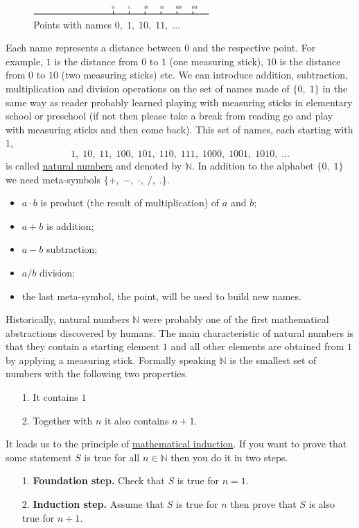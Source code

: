\documentclass[color=black,11pt]{elegantpaper}
\begin{document}
\begin{figure}[htbp]
  \centering
  \includegraphics[width=0.6\textwidth]{xfig_stuff/Line_with_natural_numbers.eps}
  \caption{Points with names $0,\;1,\;10,\;11,\;\dots$}
  \label{fig:natural_numbers}
\end{figure}
Each name represents a distance between $0$ and the respective point. For example, $1$ is the distance from $0$ to $1$ (one measuring stick), $10$ is the distance from $0$ to $10$ (two measuring sticks) etc. We can introduce addition,  subtraction,  multiplication and division operations on the set of names made of $\{0,\;1 \}$ in the same way as reader probably learned playing with measuring sticks in elementary school or preschool (if not then please take a break from reading go and play with measuring sticks and then come back). This set of names, each starting with $1,$
$$
1,\;10,\;11,\;100,\;101,\;110,\;111,\;1000,\;1001,\;1010,\;\dots
$$
is called \href{https://en.wikipedia.org/wiki/Natural_number}{natural numbers} and denoted by $\mathbb{N}.$ In addition to the alphabet $\{0,\;1\}$ we need meta-symbols $\{+,\;-,\;\cdot,\;/ ,\; . \}.$ 
\begin{itemize}
\item $a \cdot b$ is product (the result of multiplication) of $a$ and $b;$
\item $a+b$ is addition;
\item $a-b$ subtraction;
\item $a / b$ division;
\item the last meta-symbol, the point, will be used to build new names. 
\end{itemize}
Historically, natural numbers $\mathbb{N}$ were probably one of the first mathematical abstractions discovered by humans.  The main characteristic of natural numbers is that they contain a starting element $1$ and all other elements are obtained from $1$ by applying a measuring stick. Formally speaking $\mathbb{N}$ is the smallest set of numbers with the following two properties.
\begin{itemize}
\item[1.] It contains $1$
\item[2.] Together with $n$ it also contains $n+1 .$ 
\end{itemize}
It leads us to the principle of \href{https://en.wikipedia.org/wiki/Mathematical_induction}{mathematical induction}. If you want to prove that some statement $S$ is true for all $n\in \mathbb{N}$ then you do it in two steps.
\begin{itemize} 
\item[1.]{\bf Foundation step.} Check that $S$ is true for $n=1.$ 
\item[2.]{\bf Induction step.} Assume that $S$ is true for $n$  then prove that $S$ is also true for $n+1.$ 
\end{itemize}
 
\end{document}
